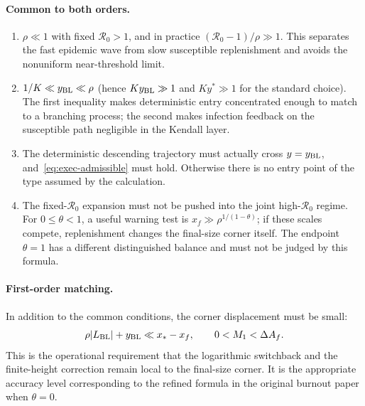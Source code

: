 \documentclass[11pt,a4paper]{article}
\newcommand{\Rzero}{\mathcal R_0}
\newcommand{\BL}{y_{\rm BL}}
\newcommand{\xf}{x_f}
\newcommand{\xs}{x_*}
\begin{document}
\paragraph{Common to both orders.}
\begin{enumerate}
 \item $\rho\ll1$ with fixed $\Rzero>1$, and in practice
 $(\Rzero-1)/\rho\gg1$.  This separates the fast epidemic wave from slow
 susceptible replenishment and avoids the nonuniform near-threshold limit.
 \item $1/K\ll\BL\ll\rho$ (hence $K\BL\gg1$ and $Ky^*\gg1$ for the standard
 choice).  The first inequality makes deterministic entry concentrated enough
 to match to a branching process; the second makes infection feedback on the
 susceptible path negligible in the Kendall layer.
 \item The deterministic descending trajectory must actually cross
 $y=\BL$, and~\eqref{eq:exec-admissible} must hold.  Otherwise there is no
 entry point of the type assumed by the calculation.
 \item The fixed-$\Rzero$ expansion must not be pushed into the joint
 high-$\Rzero$ regime.  For $0\leq\theta<1$, a useful warning test is
 $\xf\gg\rho^{1/(1-\theta)}$; if these scales compete, replenishment changes
 the final-size corner itself.  The endpoint $\theta=1$ has a different
 distinguished balance and must not be judged by this formula.
\end{enumerate}

\paragraph{First-order matching.}
In addition to the common conditions, the corner displacement must be small:
\begin{equation}
 \rho|L_{\rm BL}|+\BL\ll \xs-\xf,
 \qquad 0<M_1<\Delta A_f.
 \label{eq:exec-first-cond}
\end{equation}
This is the operational requirement that the logarithmic switchback and the
finite-height correction remain local to the final-size corner.  It is the
appropriate accuracy level corresponding to the refined formula in the
original burnout paper when $\theta=0$.
\end{document}
